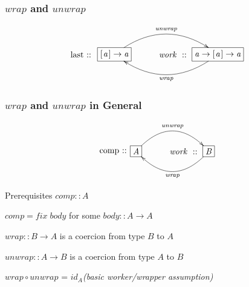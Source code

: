\documentclass[smaller]{beamer}
\makeatletter
\newcommand{\Conid}[1]{\mathit{#1}}
\newcommand{\Varid}[1]{\mathit{#1}}
\newcommand{\wrapunwrap}[3]
{$$\xymatrix@C=18pt@R=0pt{
        *[r]{\raisebox{-6pt}{#1\ ::\hspace*{-3pt}}}
      & *+[F-:]{#2} 
                \ar@/^2pc/[rr]^-{\ensuremath{\Varid{unwrap}}}
      & *[r]{\ensuremath{\Varid{work}}\ ::\ }
      & *+[F-:]{#3}="work"
                \ar@/^2pc/[ll]^-{\ensuremath{\Varid{wrap}}} 
}$$}
\makeatother
\begin{document}
\begin{frame}[fragile]
\frametitle{\ensuremath{\Varid{wrap}} and \ensuremath{\Varid{unwrap}}}

\wrapunwrap{last}{\ensuremath{[\mskip1.5mu \Varid{a}\mskip1.5mu]\to \Varid{a}}}{\ensuremath{\Varid{a}\to [\mskip1.5mu \Varid{a}\mskip1.5mu]\to \Varid{a}}}

\end{frame}

\begin{frame}[fragile]
\frametitle{\ensuremath{\Varid{wrap}} and \ensuremath{\Varid{unwrap}} in General}

\wrapunwrap{comp}{\ensuremath{\Conid{A}}}{\ensuremath{\Conid{B}}}

\end{frame}

\begin{frame}[fragile]
\begin{block}{Prerequisites}
\ensuremath{\Varid{comp}\mathbin{::}\Conid{A}}

\ensuremath{\Varid{comp}\mathrel{=}\Varid{fix}\;\Varid{body}} for some \ensuremath{\Varid{body}\mathbin{::}\Conid{A}\to \Conid{A}}

\vskip 0.1in

\ensuremath{\Varid{wrap}\mathbin{::}\Conid{B}\to \Conid{A}} is a coercion from type \ensuremath{\Conid{B}} to \ensuremath{\Conid{A}}

\ensuremath{\Varid{unwrap}\mathbin{::}\Conid{A}\to \Conid{B}} is a coercion from type \ensuremath{\Conid{A}} to \ensuremath{\Conid{B}}

\vskip 0.1in

\ensuremath{\Varid{wrap}\mathbin{\circ}\Varid{unwrap}} = $\ensuremath{\Varid{id}}_\ensuremath{\Conid{A}}$\hskip 1in{\em (basic worker/wrapper assumption)}
\end{block}


\end{frame}
\end{document}
